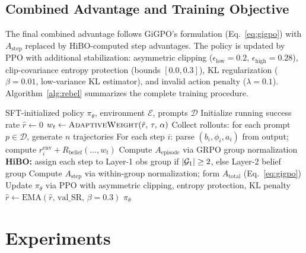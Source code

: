 \documentclass{article}
\begin{document}
\subsection{Combined Advantage and Training Objective}

The final combined advantage follows GiGPO's formulation (Eq.~\eqref{eq:gigpo})
with $A_{\text{step}}$ replaced by HiBO-computed step advantages.
The policy is updated by PPO with additional stabilization:
asymmetric clipping ($\epsilon_{\text{low}}=0.2$, $\epsilon_{\text{high}}=0.28$),
clip-covariance entropy protection (bounds $[0.0, 0.3]$), KL regularization
($\beta = 0.01$, low-variance KL estimator), and invalid action penalty
($\lambda = 0.1$).
Algorithm~\ref{alg:rebel} summarizes the complete training procedure.

\begin{algorithm}[t]
\caption{ReBel Training}
\label{alg:rebel}
\begin{algorithmic}[1]
\REQUIRE SFT-initialized policy $\pi_\theta$, environment $\mathcal{E}$, prompts $\mathcal{D}$
\STATE Initialize running success rate $\hat{r} \leftarrow 0$
  \STATE $w_t \leftarrow \textsc{AdaptiveWeight}(\hat{r},\, \tau,\, \alpha)$ \hfill{}
  \STATE Collect rollouts: for each prompt $p \in \mathcal{D}$, generate $n$ trajectories
  \STATE For each step $i$: parse $(b_i, \phi_i, a_i)$ from output; compute $r_i^{\text{env}} + R_{\text{belief}}(\ldots, w_t)$
  \STATE Compute $A_{\text{episode}}$ via GRPO group normalization
  \STATE \textbf{HiBO:} assign each step to Layer-1 obs group if $|{\cal G}_1| \geq 2$, else Layer-2 belief group
  \STATE Compute $A_{\text{step}}$ via within-group normalization; form $A_{\text{total}}$ (Eq.~\ref{eq:gigpo})
  \STATE Update $\pi_\theta$ via PPO with asymmetric clipping, entropy protection, KL penalty
    \STATE $\hat{r} \leftarrow \text{EMA}(\hat{r},\, \text{val\_SR},\, \beta{=}0.3)$
  \ENDIF
\ENDFOR
\RETURN $\pi_\theta$
\end{algorithmic}
\end{algorithm}


\section{Experiments}
\label{sec:experiments}
\end{document}
